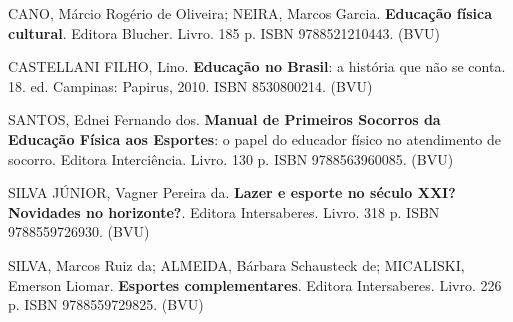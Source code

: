 \begin{pud}
\begin{bibbasica}
	\end{bibbasica}
	
	\begin{bibcomplementar}
    	\item CANO, Márcio Rogério de Oliveira; NEIRA, Marcos Garcia. \textbf{Educação física cultural}. Editora Blucher. Livro. 185  p. ISBN 9788521210443. (BVU)
		\item CASTELLANI FILHO, Lino. \textbf{Educação no Brasil}: a história que não se conta. 18. ed. Campinas: Papirus, 2010. ISBN 8530800214. (BVU)
		
		\item SANTOS, Ednei Fernando dos. \textbf{Manual de Primeiros Socorros da Educação Física aos Esportes}: o papel do educador físico no atendimento de socorro. Editora Interciência. Livro. 130 p. ISBN 9788563960085. (BVU)
		\item SILVA JÚNIOR, Vagner Pereira da. \textbf{Lazer e esporte no século XXI? Novidades no horizonte?}. Editora Intersaberes. Livro. 318 p. ISBN 9788559726930. (BVU)
		
		\item SILVA, Marcos Ruiz da; ALMEIDA, Bárbara Schausteck de; MICALISKI, Emerson Liomar. \textbf{Esportes complementares}. Editora Intersaberes. Livro. 226 p. ISBN 9788559729825. (BVU) %
					
	\end{bibcomplementar}
	
	
	
	
\end{pud}


